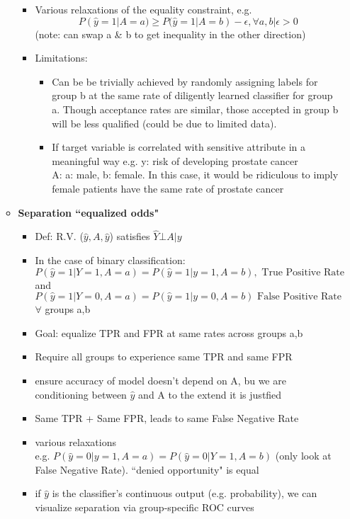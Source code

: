 \documentclass[10pt, oneside]{article}
\begin{document}
\begin{itemize}
\begin{itemize}
\begin{itemize}
            \item Various relaxations of the equality constraint, e.g. \[P(\hat y = 1 | A =a) \geq P(\hat y = 1| A=b) - \epsilon ,\forall a,b | \epsilon > 0\] (note: can swap a \& b to get inequality in the other direction)
            \item Limitations:
            \begin{itemize}
                \item Can be be trivially achieved by randomly assigning labels for group b at the same rate of diligently learned classifier for group a. Though acceptance rates are similar, those accepted in group b will be less qualified (could be due to limited data). 
                \item If target variable is correlated with sensitive attribute in a meaningful way e.g. y: risk of developing prostate cancer\\A: a: male, b: female. In this case, it would be ridiculous to imply female patients have the same rate of prostate cancer
            \end{itemize}
        \end{itemize}
        \item \textbf{Separation ``equalized odds"}
        \begin{itemize}
            \item Def: R.V. ($\hat y, A, \hat y$) satisfies $\hat Y \bot A|y$
            \item In the case of binary classification:\[P(\hat y = 1 | Y= 1, A=a) = P(\hat y = 1| y = 1, A=b), \text{ True Positive Rate}\] and \[P(\hat y = 1| Y=0, A=a) = P(\hat y = 1|y=0, A=b) \text{ False Positive Rate}\]$\forall$ groups a,b
            \item Goal: equalize TPR and FPR at same rates across groups a,b
            \item Require all groups to experience same TPR and same FPR
            \item ensure accuracy of model doesn't depend on A, bu we are conditioning between $\hat y$ and A to the extend it is justfied
            \item Same TPR + Same FPR, leads to same False Negative Rate
            \item various relaxations\\e.g. $P(\hat y = 0 |y=1, A=a) = P(\hat y = 0 |Y=1, A=b)$ (only look at False Negative Rate). ``denied opportunity" is equal
            \item if $\hat y$ is the classifier's continuous output (e.g. probability), we can visualize separation via group-specific ROC curves

\end{itemize}
\end{itemize}
\end{itemize}
\end{document}
